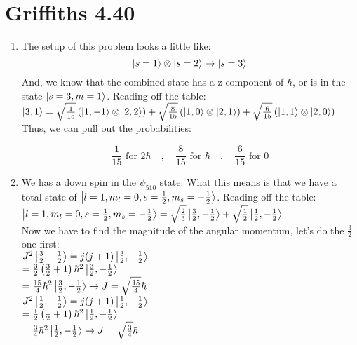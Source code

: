 \documentclass[12pt]{article}
\begin{document}
\section*{Griffiths 4.40}
\begin{enumerate}[label=\alph*)]
\item The setup of this problem looks a little like: 
\[\ket{s=1}\otimes \ket{s=2} \rightarrow \ket{s=3}\]
And, we know that the combined state has a z-component of $\hbar$, or is in the state $\ket{s=3, m=1}$. Reading off the table:\vspace{0.5em}\\
$\ket{3, 1} = \sqrt{\frac{1}{15}}\left(\ket{1, -1} \otimes \ket{2, 2}\right) + \sqrt{\frac{8}{15}}\left(\ket{1, 0} \otimes \ket{2, 1}\right) + \sqrt{\frac{6}{15}}\left(\ket{1, 1} \otimes \ket{2, 0}\right)$\vspace{0.5em}\\
Thus, we can pull  out the probabilities:

\[\boxed{\frac{1}{15} \text{ for } 2\hbar \quad , \quad \frac{8}{15} \text{ for } \hbar \quad , \quad \frac{6}{15} \text{ for } 0 }\]

\item 

We has a down spin in the $\psi_{510}$ state. What this means is that we have a total state of $\ket{l=1, m_l = 0, s=\frac{1}{2}, m_s = -\frac{1}{2}}$. Reading off the table: \vspace{0.5em}\\
$\ket{l=1, m_l = 0, s=\frac{1}{2}, m_s = -\frac{1}{2}} = \sqrt{\frac{2}{3}}\ket{\frac{3}{2}, -\frac{1}{2}} + \sqrt{\frac{1}{2}}\ket{\frac{1}{2}, -\frac{1}{2}}$\vspace{0.5em}\\
Now we have to find the magnitude of the angular momentum, let's do the $\frac{3}{2}$ one first:\vspace{0.5em}\\
$J^2 \ket{\frac{3}{2}, -\frac{1}{2}} = j(j+1) \ket{\frac{3}{2}, -\frac{1}{2}}$\vspace{0.5em}\\
\hspace*{4.4em} $ = \frac{3}{2}\left(\frac{3}{2} + 1\right)\hbar^2  \ket{\frac{3}{2}, -\frac{1}{2}}$\vspace{0.5em}\\
\hspace*{4.4em} $= \frac{15}{4}\hbar^2 \ket{\frac{3}{2}, -\frac{1}{2}} \rightarrow J = \sqrt{\frac{15}{4}}\hbar$\vspace{1.5em}\\
$J^2 \ket{\frac{1}{2}, -\frac{1}{2}} = j(j+1) \ket{\frac{1}{2}, -\frac{1}{2}}$\vspace{0.5em}\\
\hspace*{4.4em} $ = \frac{1}{2}\left(\frac{1}{2} + 1\right)\hbar^2  \ket{\frac{1}{2}, -\frac{1}{2}}$\vspace{0.5em}\\
\hspace*{4.4em} $= \frac{3}{4}\hbar^2 \ket{\frac{1}{2}, -\frac{1}{2}} \rightarrow J = \sqrt{\frac{3}{4}}\hbar$


\end{enumerate}
\end{document}
